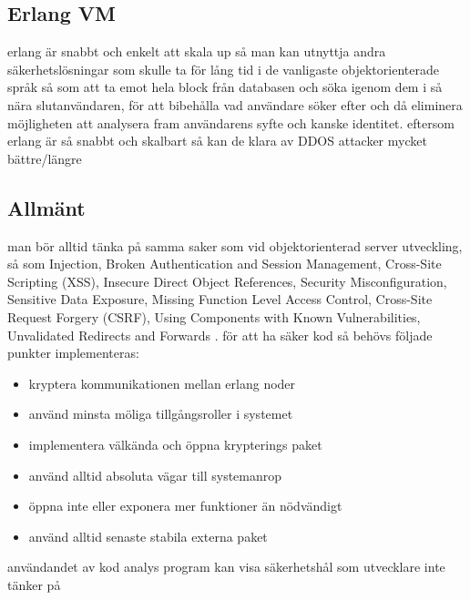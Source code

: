 \documentclass[12pt]{article}
\begin{document}
\subsection*{Erlang VM}
	erlang är snabbt och enkelt att skala up så man kan utnyttja andra säkerhetslösningar som skulle ta för lång tid i de vanligaste objektorienterade språk  så som att ta emot hela block från databasen och söka igenom dem i så nära slutanvändaren, för att bibehålla vad användare söker efter och då eliminera möjligheten att analysera fram användarens syfte och kanske identitet\cite{database}. eftersom erlang är så snabbt och skalbart så kan de klara av DDOS attacker mycket bättre/längre\cite{resource-safe}
\subsection*{Allmänt}
	man bör alltid tänka på samma saker som vid objektorienterad server utveckling, så som Injection, Broken Authentication and Session Management, Cross-Site Scripting (XSS), Insecure Direct Object References, Security Misconfiguration, Sensitive Data Exposure, Missing Function Level Access Control, Cross-Site Request Forgery (CSRF), Using Components with Known Vulnerabilities, Unvalidated Redirects and Forwards \cite{owasp}.
	för att ha säker kod så behövs följade punkter implementeras:
	\begin{itemize} 
		\item kryptera kommunikationen mellan erlang noder
		\item använd minsta möliga tillgångsroller i systemet
		\item implementera välkända och öppna krypterings paket
		\item använd alltid absoluta vägar till systemanrop
		\item öppna inte eller exponera mer funktioner än nödvändigt
		\item använd alltid senaste stabila externa paket
	\end{itemize}
användandet av kod analys program kan visa säkerhetshål som utvecklare inte tänker på
\end{document}
